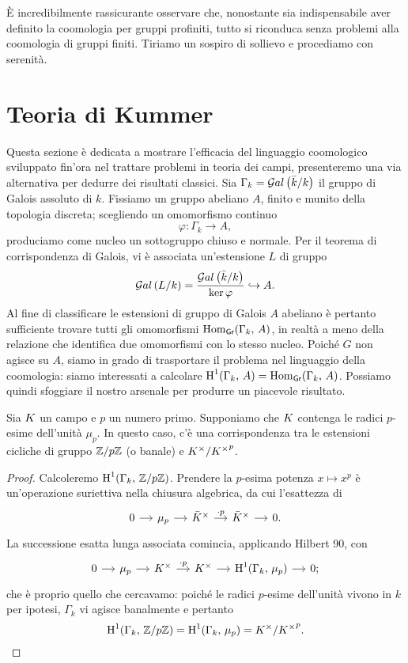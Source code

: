 \begin{Profinite}
	È incredibilmente rassicurante osservare che, nonostante sia indispensabile aver definito la coomologia per gruppi profiniti, tutto si riconduca senza problemi alla coomologia di gruppi finiti. Tiriamo un sospiro di sollievo e procediamo con serenità.
\end{Profinite}

\section{Teoria di Kummer}
Questa sezione è dedicata a mostrare l'efficacia del linguaggio coomologico sviluppato fin'ora nel trattare problemi in teoria dei campi, presenteremo una via alternativa per dedurre dei risultati classici.
Sia $ \Gamma_k = \mathcal{G}al\left( \bar{k}/ k \right) $ il gruppo di Galois assoluto di $ k $. Fissiamo un gruppo abeliano $ A $, finito e munito della topologia discreta; scegliendo un omomorfismo continuo
\[ \varphi \colon \Gamma_k \to A, \]
produciamo come nucleo un sottogruppo chiuso e normale. Per il teorema di corrispondenza di Galois, vi è associata un'estensione $ L $ di gruppo
\[ \mathcal{G}al\left( L/k \right) = \frac{\mathcal{G}al\left( \bar{k}/ k \right)}{\ker \varphi} \hookrightarrow A. \]
Al fine di classificare le estensioni di gruppo di Galois $ A $ abeliano è pertanto sufficiente trovare tutti gli omomorfismi $ \operatorname{Hom}_{\textsf{Gr}}(\Gamma_k, \, A) $, in realtà a meno della relazione che identifica due omomorfismi con lo stesso nucleo. Poiché $ G $ non agisce su $ A $, siamo in grado di trasportare il problema nel linguaggio della coomologia: siamo interessati a calcolare $ \operatorname{H}^1(\Gamma_k, \, A) = \operatorname{Hom}_{\textsf{Gr}}(\Gamma_k, \, A) $. Possiamo quindi sfoggiare il nostro arsenale per produrre un piacevole risultato.

\begin{theorem}[di Kummer]
	Sia $ K $ un campo e $ p $ un numero primo. Supponiamo che $ K $ contenga le radici $ p $-esime dell'unità $ \mu_p $. In questo caso, c'è una corrispondenza tra le estensioni cicliche di gruppo $ \mathbb{Z}/p\mathbb{Z} $ (o banale) e $ K^\times / {K^\times}^p $.
\end{theorem}
\begin{proof}
	Calcoleremo $ \operatorname{H}^1(\Gamma_k, \, \mathbb{Z}/p\mathbb{Z}) $. Prendere la $ p $-esima potenza $ x \mapsto x^p $ è un'operazione suriettiva nella chiusura algebrica, da cui l'esattezza di
	\[\begin{tikzcd}[column sep = small]
	0 \rar
	& \mu_p \rar
	& \bar{\K}^\times \rar["\cdot p"]
	& \bar{\K}^\times \rar
	& 0.
	\end{tikzcd}  \]
	La successione esatta lunga associata comincia, applicando Hilbert 90, con
	\[\begin{tikzcd}[column sep = small]
	0 \rar
	& \mu_p \rar
	& \K^\times \rar["\cdot p"]
	& \K^\times \rar
	& \HH^1(\Gamma_k, \, \mu_p) \rar
	& 0;
	\end{tikzcd}  \]
	che è proprio quello che cercavamo: poiché le radici $ p $-esime dell'unità vivono in $ k $ per ipotesi, $ \Gamma_k $ vi agisce banalmente e pertanto
	\[ \operatorname{H}^1(\Gamma_k, \, \mathbb{Z}/p\mathbb{Z}) = \operatorname{H}^1(\Gamma_k, \, \mu_p) =K^\times / {K^\times}^p . \qedhere \]
\end{proof}

